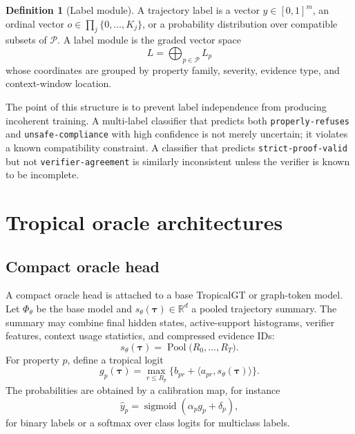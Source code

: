 \documentclass[11pt]{article}
\theoremstyle{definition}
\newtheorem{definition}[theorem]{Definition}
\theoremstyle{remark}
\newcommand{\R}{\mathbb{R}}
\newcommand{\sigmoid}{\operatorname{sigmoid}}
\newcommand{\traj}{\boldsymbol{\tau}}
\newcommand{\Prop}{\mathcal{P}}
\numberwithin{equation}{section}
\begin{document}
\begin{definition}[Label module]
A trajectory label is a vector \(y\in[0,1]^m\), an ordinal vector \(o\in\prod_j\{0,\ldots,K_j\}\), or a probability distribution over compatible subsets of \(\Prop\).  A label module is the graded vector space
\begin{equation}
    L=\bigoplus_{p\in\Prop} L_p
\end{equation}
whose coordinates are grouped by property family, severity, evidence type, and context-window location.
\end{definition}

The point of this structure is to prevent label independence from producing incoherent training.  A multi-label classifier that predicts both \texttt{properly-refuses} and \texttt{unsafe-compliance} with high confidence is not merely uncertain; it violates a known compatibility constraint.  A classifier that predicts \texttt{strict-proof-valid} but not \texttt{verifier-agreement} is similarly inconsistent unless the verifier is known to be incomplete.

\section{Tropical oracle architectures}

\subsection{Compact oracle head}

A compact oracle head is attached to a base TropicalGT or graph-token model.  Let \(\Phi_\theta\) be the base model and \(s_\theta(\traj)\in\R^d\) a pooled trajectory summary.  The summary may combine final hidden states, active-support histograms, verifier features, context usage statistics, and compressed evidence IDs:
\begin{equation}
    s_\theta(\traj)=\operatorname{Pool}\big(R_0,\ldots,R_T\big).
\end{equation}
For property \(p\), define a tropical logit
\begin{equation}
    g_p(\traj)=\max_{r\le R_p}\{b_{pr}+\langle a_{pr},s_\theta(\traj)\rangle\}.
\end{equation}
The probabilities are obtained by a calibration map, for instance
\begin{equation}
    \hat y_p=\sigmoid\left(\alpha_p g_p+\delta_p\right),
\end{equation}
for binary labels or a softmax over class logits for multiclass labels.
\end{document}
